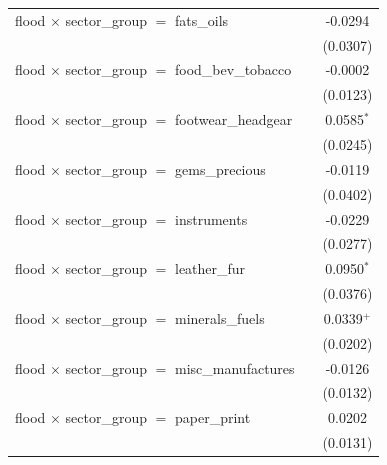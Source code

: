 \begin{tabular}{lcc}
   flood $\times$ sector\_group $=$ fats\_oils                     &                       & -0.0294\\   
                                                                   &                       & (0.0307)\\   
   flood $\times$ sector\_group $=$ food\_bev\_tobacco             &                       & -0.0002\\   
                                                                   &                       & (0.0123)\\   
   flood $\times$ sector\_group $=$ footwear\_headgear             &                       & 0.0585$^{*}$\\   
                                                                   &                       & (0.0245)\\   
   flood $\times$ sector\_group $=$ gems\_precious                 &                       & -0.0119\\   
                                                                   &                       & (0.0402)\\   
   flood $\times$ sector\_group $=$ instruments                    &                       & -0.0229\\   
                                                                   &                       & (0.0277)\\   
   flood $\times$ sector\_group $=$ leather\_fur                   &                       & 0.0950$^{*}$\\   
                                                                   &                       & (0.0376)\\   
   flood $\times$ sector\_group $=$ minerals\_fuels                &                       & 0.0339$^{+}$\\   
                                                                   &                       & (0.0202)\\   
   flood $\times$ sector\_group $=$ misc\_manufactures             &                       & -0.0126\\   
                                                                   &                       & (0.0132)\\   
   flood $\times$ sector\_group $=$ paper\_print                   &                       & 0.0202\\   
                                                                   &                       & (0.0131)\\   

\end{tabular}
